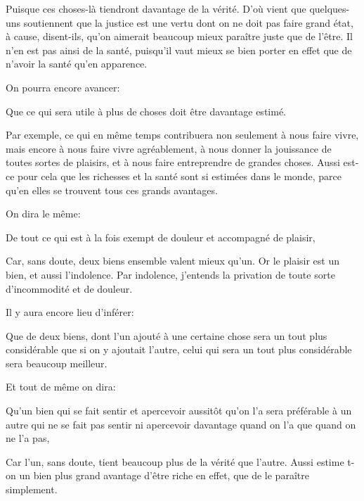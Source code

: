 Puisque ces choses-là tiendront davantage de la vérité. D'où vient que quelques-uns soutiennent que la justice est une vertu
dont on ne doit pas faire grand état, à cause, disent-ils, qu'on aimerait beaucoup mieux paraître juste que de l'être. Il
n'en est pas ainsi de la santé, puisqu'il vaut mieux se bien porter en effet que de n'avoir la santé qu'en apparence.

\bigbreak

On pourra encore avancer:

\begin{lieu}
  Que ce qui sera utile à plus de choses doit être davantage estimé.
\end{lieu}

Par exemple, ce qui en même temps contribuera non seulement à nous faire vivre, mais encore à nous faire vivre agréablement,
à nous donner la jouissance de toutes sortes de plaisirs, et à nous faire entreprendre de grandes choses. Aussi est-ce pour
cela que les richesses et la santé sont si estimées dans le monde, parce qu'en elles se trouvent tous ces grands avantages.

\bigbreak

On dira le même:

\begin{lieu}
  De tout ce qui est à la fois exempt de douleur et accompagné de plaisir,
\end{lieu}

Car, sans doute, deux biens ensemble valent mieux qu'un. Or le plaisir est un bien, et aussi l'indolence. Par indolence,
j'entends la privation de toute sorte d'incommodité et de douleur.

\bigbreak

Il y aura encore lieu d'inférer:

\begin{lieu}
  Que de deux biens, dont l'un ajouté à une certaine chose sera un tout plus considérable que si on y ajoutait l'autre,
  celui qui sera un tout plus considérable sera beaucoup meilleur.
\end{lieu}

Et tout de même on dira:

\begin{lieu}
  Qu'un bien qui se fait sentir et apercevoir aussitôt qu'on l'a sera préférable à un autre qui ne se fait pas sentir ni
  apercevoir davantage quand on l'a que quand on ne l'a pas,
\end{lieu}

Car l'un, sans doute, tient beaucoup plus de la vérité que l'autre. Aussi estime t-on un bien plus grand avantage d'être
riche en effet, que de le paraître simplement.

